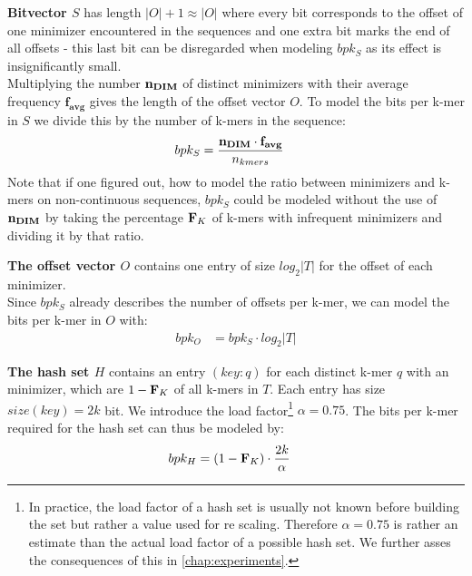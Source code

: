 \documentclass[a4paper,titlepage,onecolumn,oneside,12pt,nenglish,titlepage=firstiscover]{scrbook}
\theoremstyle{plain} %
\theoremstyle{definition} %
\theoremstyle{remark} %
\theoremstyle{plain}
\newcommand{\kmer}{q}
\newcommand{\select}{sel}
\newcommand{\timeForOperationOnStructure}[2]{T_{#1_{#2}}} %
\newcommand{\varAverageFrequency}{\textbf{f}_{\textbf{avg}}}
\begin{document}
\textbf{Bitvector $S$} has length $|O|+1 \approx |O|$ where every bit corresponds to the offset of one minimizer encountered in the sequences and one extra bit marks the end of all offsets - this last bit can be disregarded when modeling $bpk_S$ as its effect is insignificantly small.\\
Multiplying the number $\textbf{n}_{\textbf{DIM}}$ of distinct \infrequent minimizers with their average frequency $\varAverageFrequency$ gives the length of the offset vector $O$. To model the bits per k-mer in $S$ we divide this by the number of k-mers in the sequence:
\newcommand{\bpkS}{bpk_{S}	&= \frac{\varNumberOfDistinctMinimizers \cdot \varAverageFrequency}{\nkmers}}
\begin{align}
	\bpkS \label{constraint:bpkS} 
\end{align}
Note that if one figured out, how to model the ratio between minimizers and k-mers on non-continuous sequences, $bpk_S$ could be modeled without the use of $\textbf{n}_{\textbf{DIM}}$ by taking the percentage $\textbf{F}_{K}$ of k-mers with infrequent minimizers and dividing it by that ratio.

\textbf{The offset vector $O$} contains one entry of size $log_2 |T|$ for the offset of each \infrequent minimizer.\\
Since $bpk_S$ already describes the number of offsets per k-mer, we can model the bits per k-mer in $O$ with:
\newcommand{\bpkO}{bpk_O &= bpk_S \cdot log_2 |T|}
\begin{align}
	\bpkO \label{constraint:bpkO}
\end{align}

\textbf{The hash set $H$} contains an entry $(key:\kmer)$ for each distinct k-mer $\kmer$ with an \infrequent minimizer, which are $1-\textbf{F}_{K}$ of all k-mers in $T$.
Each entry has size $size(key) = 2k$ bit. We introduce the load factor\footnote{In practice, the load factor of a hash set is usually not known before building the set but rather a value used for re scaling. Therefore $\alpha=0.75$ is rather an estimate than the actual load factor of a possible hash set. We further asses the consequences of this in \cref{chap:experiments}.} $\alpha=0.75$.
The bits per k-mer required for the hash set can thus be modeled by:
\newcommand{\bpkH}{bpk_H &= (1-\varCDF{K}) \cdot \frac{2k}{\alpha}}
\begin{align}
	\bpkH \label{constraint:bpkH}
\end{align}
\end{document}

